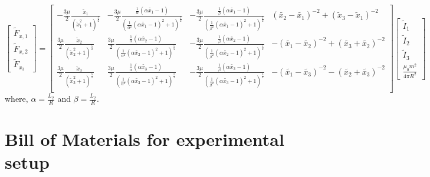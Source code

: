 \documentclass[english]{article}
\begin{document}
\begin{equation}
\begin{bmatrix}
	\tilde{F}_{x,1}\\[0.3em]
	\tilde{F}_{x,2}\\[0.3em]
	\tilde{F}_{x_3}
\end{bmatrix}
=
\begin{bmatrix}
			-\frac{3\mu}{2} \frac{\tilde{x}_1}{\left(\tilde{x}_1^2 + 1 \right)^{\frac{5}{2}}}  & 
-\frac{3\mu}{2}\frac{\frac{1}{\alpha}\left(\alpha\tilde{x_1} - 1 \right)}{\left(\frac{1}{\alpha^2}\left(\alpha \tilde{x_1} - 1 \right)^2 + 1 \right)^{\frac{5}{2}}} & 
-\frac{3\mu}{2}\frac{\frac{1}{\beta}\left(\alpha\tilde{x_1} - 1 \right)}{\left(\frac{1}{\beta^2}\left(\alpha \tilde{x_1} - 1 \right)^2 + 1 \right)^{\frac{5}{2}}} &
\left(\tilde{x_2}-\tilde{x_1}\right)^{-2} 
+ \left(\tilde{x}_3 - \tilde{x}_1\right)^{-2}\\
			
			\frac{3\mu}{2} \frac{\tilde{x}_2}{\left(\tilde{x}_2^2 + 1 \right)^{\frac{5}{2}}}  & 
\frac{3\mu}{2}\frac{\frac{1}{\alpha}\left(\alpha\tilde{x_2} - 1 \right)}{\left(\frac{1}{\alpha^2}\left(\alpha \tilde{x_2} - 1 \right)^2 + 1 \right)^{\frac{5}{2}}} & 
-\frac{3\mu}{2}\frac{\frac{1}{\beta}\left(\alpha\tilde{x_2} - 1 \right)}{\left(\frac{1}{\beta^2}\left(\alpha \tilde{x_2} - 1 \right)^2 + 1 \right)^{\frac{5}{2}}} &
-\left(\tilde{x_1}-\tilde{x_2}\right)^{-2} +\left(\tilde{x_3}+\tilde{x_2}\right)^{-2} \\

		\frac{3\mu}{2} \frac{\tilde{x}_3}{\left(\tilde{x}_3^2 + 1 \right)^{\frac{5}{2}}}  & 
\frac{3\mu}{2}\frac{\frac{1}{\alpha}\left(\alpha\tilde{x_3} - 1 \right)}{\left(\frac{1}{\alpha^2}\left(\alpha \tilde{x_3} - 1 \right)^2 + 1 \right)^{\frac{5}{2}}} & 
-\frac{3\mu}{2}\frac{\frac{1}{\beta}\left(\alpha\tilde{x_3} - 1 \right)}{\left(\frac{1}{\beta^2}\left(\alpha \tilde{x_3} - 1 \right)^2 + 1 \right)^{\frac{5}{2}}} &
-\left(\tilde{x_1}-\tilde{x_3}\right)^{-2} -\left(\tilde{x_2}+\tilde{x_3}\right)^{-2} \\

\end{bmatrix}
\begin{bmatrix}
	\tilde{I}_1\\ \tilde{I}_2 \\ \tilde{I}_3  \\ \frac{\mu_0 m^2}{4 \pi R^2}
\end{bmatrix}
\label{eq:ForceMatrix_3nondim}
\end{equation}
where, $\alpha = \frac{L_2}{R}$ and $\beta = \frac{L_2}{R}$.


\section{Bill of Materials for experimental setup}
\end{document}
